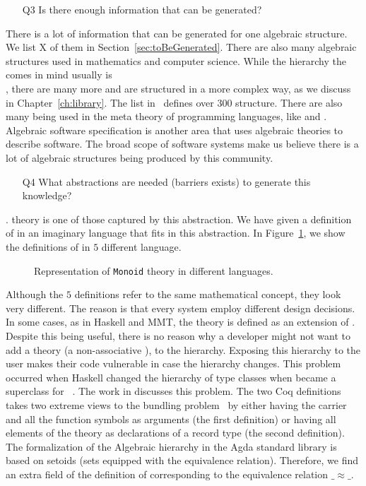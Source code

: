 \begin{itemize}
    \item[Q3] Is there enough information that can be generated? 
\end{itemize}
There is a lot of information that can be generated for one algebraic structure.  We list X of them in Section~\ref{sec:toBeGenerated}. There are also many algebraic structures used in mathematics and computer science. While the hierarchy the comes in mind usually is \\
, there are many more and are structured in a more complex way, as we discuss in Chapter~\ref{ch:library}. 
The list in~\cite{jipsen} defines over $300$ structure. There are also many being used in the meta theory of programming languages, like  and . 
Algebraic software specification is another area that uses algebraic theories to describe software. The broad scope of software systems make us believe there is a lot of algebraic structures being produced by this community.  

\begin{itemize}
    \item[Q4] What abstractions are needed (barriers exists) to generate this knowledge?
\end{itemize}.  
 theory is one of those captured by this abstraction. We have given a definition of  in an imaginary language that fits in this abstraction. In Figure~\ref{fig:mon-diff-lang}, we show the definitions of  in $5$ different language. 
\begin{figure}
    
    \caption{Representation of \lstinline|Monoid| theory in different languages.}
    \label{fig:mon-diff-lang}
\end{figure}
Although the $5$ definitions refer to the same mathematical concept, they look very different. The reason is that every system employ different design decisions. In some cases, as in Haskell and MMT, the theory \monoid is defined as an extension of \semigroup. Despite this being useful, there is no reason why a developer might not want to add a theory \unital (a non-associative \monoid), to the hierarchy. Exposing this hierarchy to the user makes their code vulnerable in case the hierarchy changes. This problem occurred when Haskell changed the hierarchy of type classes when  became a superclass for  ~\cite{wiki:haskell_hierarch}. The work in \cite{cohen2020hierarchy} discusses this problem. The two Coq definitions takes two extreme views to the bundling problem~\cite{lean2019,alhassy2019,spitters2011type} by either having the carrier and all the function symbols as arguments (the first definition) or having all elements of the theory as declarations of a record type (the second definition). 
The formalization of the Algebraic hierarchy in the Agda standard library is based on setoids (sets equipped with the equivalence relation). Therefore, we find an extra field of the definition of \monoid corresponding to the equivalence relation $\_\approx\_$. 

